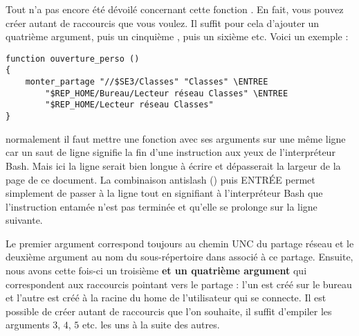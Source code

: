 Tout n'a pas encore été dévoilé concernant cette fonction 
. En fait, vous pouvez créer autant
de raccourcis que vous voulez. Il suffit pour cela d'ajouter un
quatrième argument, puis un cinquième , puis un sixième etc.
Voici un exemple :
%
\begin{lstlisting}[emph={ENTREE},emphstyle={\return}]
function ouverture_perso ()
{
    monter_partage "//$SE3/Classes" "Classes" \ENTREE
        "$REP_HOME/Bureau/Lecteur réseau Classes" \ENTREE
        "$REP_HOME/Lecteur réseau Classes"
}
\end{lstlisting}
%
\begin{RQ}
normalement il faut mettre une fonction avec ses arguments sur une
même ligne car un saut de ligne signifie la fin d'une instruction
aux yeux de l'interpréteur Bash. Mais ici la ligne serait bien longue à écrire
et dépasserait la largeur de la page de ce document.
La combinaison antislash (\verbtexte{$\backslash$}) puis ENTRÉE permet simplement
de passer à la ligne tout en signifiant à l'interpréteur Bash que l'instruction
entamée n'est pas terminée et qu'elle se prolonge sur la ligne suivante.
\end{RQ}
%
Le premier argument correspond toujours au chemin UNC du partage
réseau et le deuxième argument au nom du sous-répertoire 
dans  associé à ce partage. Ensuite, nous
avons cette fois-ci un troisième \textbf{et un quatrième argument} qui
correspondent aux raccourcis pointant vers le partage : l'un
est créé sur le bureau et l'autre est créé à
la racine du home de l'utilisateur qui se connecte.
Il est possible de créer autant de raccourcis que l'on souhaite,
il suffit d'empiler les arguments $3$, $4$, $5$ etc. 
les uns à la suite des autres.

